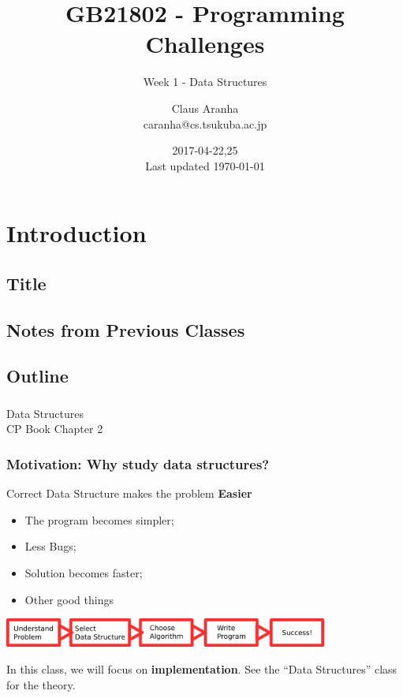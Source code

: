 \documentclass{beamer}
\title[GB21802]{GB21802 - Programming Challenges}
\subtitle[]{Week 1 - Data Structures}
\author[Claus Aranha]{Claus Aranha\\{\footnotesize caranha@cs.tsukuba.ac.jp}}
\institute{College of Information Science}
\date{2017-04-22,25\\{\tiny Last updated \today}}
\begin{document}
\section{Introduction}
\subsection{Title}
\begin{frame}
\maketitle
\end{frame}

\subsection{Notes from Previous Classes}



\subsection{Outline}

\begin{frame}
  \frametitle{}

  \begin{center}
    {\large Data Structures}\\
    CP Book Chapter 2
  \end{center}
\end{frame}


\begin{frame}
  \frametitle{Motivation: Why study data structures?}

  \begin{block}{Correct Data Structure makes the problem {\bf Easier}}
    \begin{itemize}
    \item The program becomes simpler;
    \item Less Bugs;
    \item Solution becomes faster;
    \item Other good things
    \end{itemize}
  \end{block}

  \bigskip

  \begin{center}
    \includegraphics[width=0.8\textwidth]{../img/pipeline}
  \end{center}

  \bigskip

  In this class, we will focus on {\bf implementation}. See the ``Data
  Structures'' class for the theory.  
\end{frame}
\end{document}
